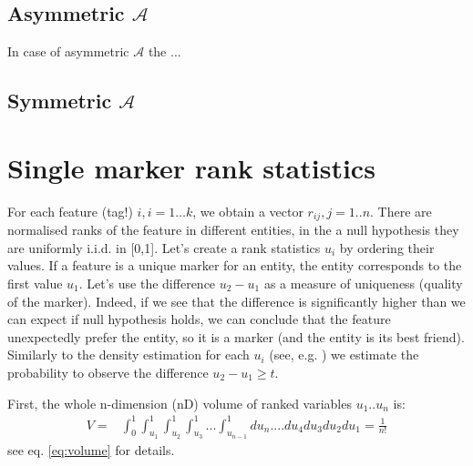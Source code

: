 \documentclass{llncs}
\begin{document}







\subsection{Asymmetric $\mathcal{A}$}

In case of asymmetric $\mathcal{A}$ the ...

\subsection{Symmetric $\mathcal{A}$}
 

\section{Single marker rank statistics}




For each feature (tag!) $i,i=1\dots k$, we obtain a vector $r_{ij}, j=1..n$. There are normalised ranks of the feature in different entities, in the a null hypothesis they are uniformly i.i.d. in [0,1]. Let's create a rank statistics $u_i$ by ordering their values. If a feature is a unique marker for an entity, the entity corresponds to the first  value $u_1$. Let's use the difference $u_2-u_1$ as a measure of uniqueness (quality of the marker). Indeed, if we see that the difference is significantly higher than we can expect if null hypothesis holds, we can conclude that the feature unexpectedly prefer the entity, so it is a marker (and the entity is its best friend). Similarly to the density estimation for each $u_i$ (see, e.g. \cite{Gut:2009}) we estimate the probability to observe the difference $u_2 - u_1 \ge t$. 

First, the whole n-dimension (nD) volume of ranked variables $u_1 .. u_n$ is:
\begin{eqnarray*}
V = &\displaystyle \int_0^1\int_{u_1}^1\int_{u_2}^1\int_{u_3}^1...\int_{u_{n-1}}^1 du_n....du_4 du_3 du_2 du_1 =  \frac{1}{n!}
\end{eqnarray*}
see eq. \ref{eq:volume} for details.
\end{document}
